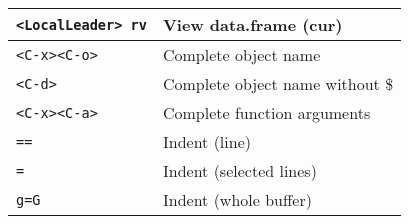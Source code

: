 \documentclass[10pt,landscape]{article}
\begin{document}
\begin{multicols}{3}
\begin{tabular}{@{}p{\the\MyLen}@{}p{\linewidth-\the\MyLen}@{}}
   \verb|<LocalLeader> rv|       & View data.frame (cur)  \\
   \hline
   \verb|<C-x><C-o>| & Complete object name              \\
   \verb|<C-d>|      & Complete object name without \$   \\
   \verb|<C-x><C-a>| & Complete function arguments       \\
   \verb|==|         & Indent (line)                     \\
   \verb|=|          & Indent (selected lines)           \\
   \verb|g=G|        & Indent (whole buffer)             \\
    \hline \hline
\end{tabular}
\vfill



\end{multicols}
\end{document}
